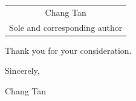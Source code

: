 \documentclass[11pt,a4paper]{article}
\begin{document}
\begin{flushright}
\begin{tabular}{c}
Chang Tan\\
Sole and corresponding author
\end{tabular}
\end{flushright}

\vspace{0.8em}

\noindent Thank you for your consideration.

\vspace{0.8em}

\noindent Sincerely,

\vspace{2em}

\noindent Chang Tan
\end{document}
